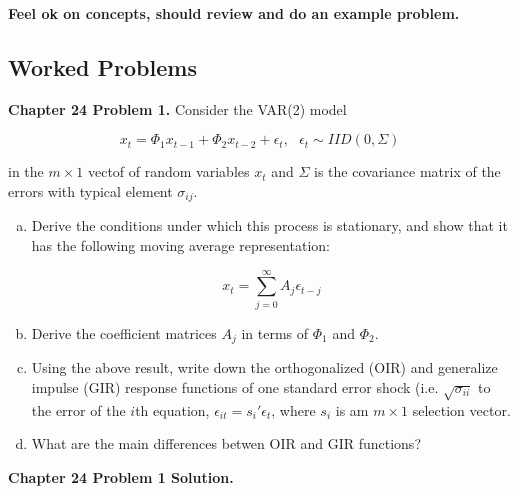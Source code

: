 \textbf{Feel ok on concepts, should review and do an example problem.}

\subsection{Worked Problems}


\textbf{Chapter 24 Problem 1.} Consider the VAR(2) model

\[
x_t = \Phi_1 x_{t-1} + \Phi_2 x_{t-2} + \epsilon_t, \ \ \ \epsilon_t \sim IID(0, \Sigma)
\]

in the \(m \times 1\) vectof of random variables \(x_t\) and \(\Sigma\) is the covariance matrix of the errors with typical element \(\sigma_{ij}\). 

\begin{enumerate}[(a)]

\item Derive the conditions under which this process is stationary, and show that it has the following moving average representation:

\begin{equation} \label{ts.ch24.p1.eq}
x_t = \sum_{j=0}^\infty A_j \epsilon_{t-j}
\end{equation}

\item Derive the coefficient matrices \(A_j\) in terms of \(\Phi_1\) and \(\Phi_2\).

\item Using the above result, write down the orthogonalized (OIR) and generalize impulse (GIR) response functions of one standard error shock (i.e. \(\sqrt{\sigma_{ii}}\) to the error of the \(i\)th equation, \(\epsilon_{it} = s_i' \epsilon_t\), where \(s_i\) is am \(m \times 1\) selection vector.

\item What are the main differences betwen OIR and GIR functions?

\end{enumerate}



\textbf{Chapter 24 Problem 1 Solution.}



